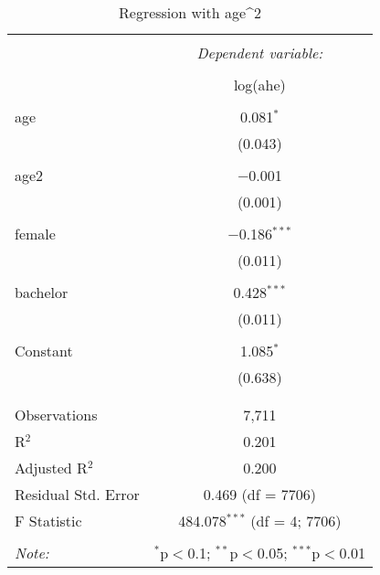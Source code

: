 
\begin{table}[!htbp] \centering 
  \caption{Regression with age^2} 
  \label{} 
\begin{tabular}{@{\extracolsep{5pt}}lc} 
\\[-1.8ex]\hline 
\hline \\[-1.8ex] 
 & \multicolumn{1}{c}{\textit{Dependent variable:}} \\ 
\cline{2-2} 
\\[-1.8ex] & log(ahe) \\ 
\hline \\[-1.8ex] 
 age & 0.081$^{*}$ \\ 
  & (0.043) \\ 
  & \\ 
 age2 & $-$0.001 \\ 
  & (0.001) \\ 
  & \\ 
 female & $-$0.186$^{***}$ \\ 
  & (0.011) \\ 
  & \\ 
 bachelor & 0.428$^{***}$ \\ 
  & (0.011) \\ 
  & \\ 
 Constant & 1.085$^{*}$ \\ 
  & (0.638) \\ 
  & \\ 
\hline \\[-1.8ex] 
Observations & 7,711 \\ 
R$^{2}$ & 0.201 \\ 
Adjusted R$^{2}$ & 0.200 \\ 
Residual Std. Error & 0.469 (df = 7706) \\ 
F Statistic & 484.078$^{***}$ (df = 4; 7706) \\ 
\hline 
\hline \\[-1.8ex] 
\textit{Note:}  & \multicolumn{1}{r}{$^{*}$p$<$0.1; $^{**}$p$<$0.05; $^{***}$p$<$0.01} \\ 
\end{tabular} 
\end{table} 
